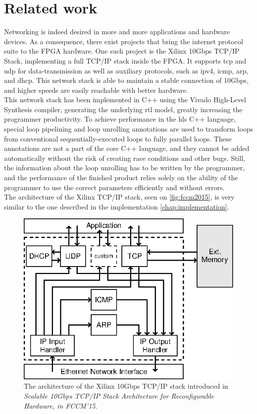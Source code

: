 \section{Related work}
Networking is indeed desired in more and more applications and hardware devices.
As a consequence, there exist projects that bring the internet protocol suite to
the FPGA hardware. One such project is the Xilinx 10Gbps TCP/IP Stack,
implementing a full TCP/IP stack inside the FPGA. It supports \gls{tcp} and
\gls{udp} for data-transmission as well as auxiliary protocols, such as
\gls{ipv4}, \gls{icmp}, \gls{arp}, and \gls{dhcp}.
This network stack is able to maintain a stable connection of 10Gbps, and higher
speeds are easily reachable with better hardware\cite{sidler2015tcp}.\\
This network stack has been implemented in C++ using the Vivado High-Level
Synthesis compiler, generating the underlying \gls{rtl} model, greatly increasing
the programmer productivity.
To achieve performance in the \gls{hls} C++ language, special loop pipelining and
loop unrolling annotations are used to transform loops from conventional
sequentially-executed loops to fully parallel loops\cite{xilinx_loop_unrolling}.
These annotations are not a part of the core C++ language, and they cannot be
added automatically without the risk of creating race conditions and
other bugs. Still, the information about the loop unrolling has to be
written by the programmer, and the performance of the finished product
relies solely on the ability of the programmer to use the correct parameters
efficiently and without errors.\\
The architecture of the Xilinx
TCP/IP stack, seen on \autoref{fig:fccm2015}, is very similar to the
one described in the implementation \autoref{chap:implementation}.
\begin{figure}[h]
\centering
\includegraphics[scale=1]{introduction/fccm2015.eps}
\caption{The architecture of the Xilinx 10Gbps TCP/IP stack introduced in
\textit{Scalable 10Gbps TCP/IP Stack Architecture for Reconfigurable Hardware,
in FCCM’15}\cite{sidler2015tcp}.}
\label{fig:fccm2015}
\end{figure}

